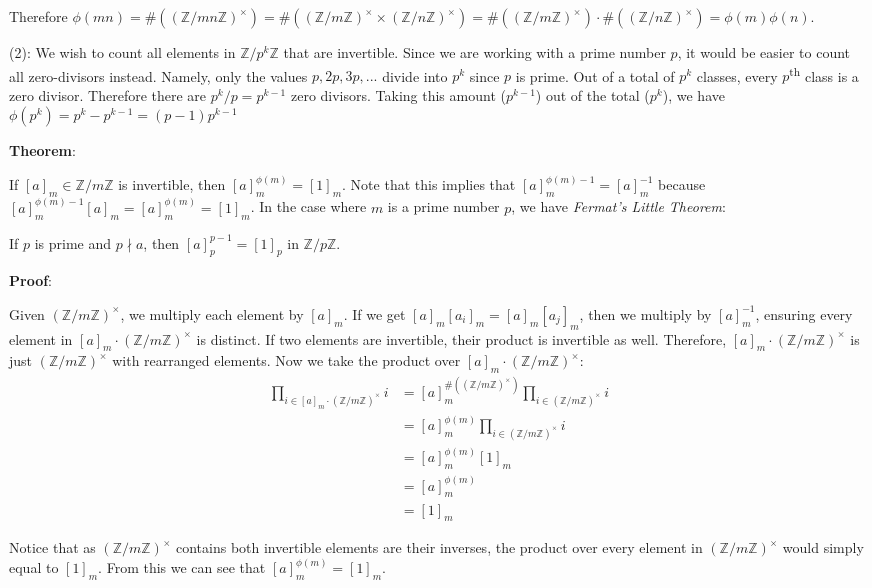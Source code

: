 \documentclass{article}
\begin{document}
\begin{multicols*}{2}
Therefore $\phi(mn) = \#((\mathbb{Z}/mn\mathbb{Z})^\times) = \#((\mathbb{Z}/m\mathbb{Z})^\times \times (\mathbb{Z}/n\mathbb{Z})^\times) = \#((\mathbb{Z}/m\mathbb{Z})^\times) \cdot \#((\mathbb{Z}/n\mathbb{Z})^\times) = \phi(m)\phi(n)$.

(2): We wish to count all elements in $\mathbb{Z}/p^k\mathbb{Z}$ that are invertible. Since we are working with a prime number $p$, it would be easier to count all zero-divisors instead. Namely, only the values $p,2p,3p,...$ divide into $p^k$ since $p$ is prime. Out of a total of $p^k$ classes, every $p$\textsuperscript{th} class is a zero divisor. Therefore there are $p^{k}/p = p^{k-1}$ zero divisors. Taking this amount ($p^{k-1}$) out of the total ($p^k$), we have $\phi(p^k) = p^k - p^{k-1} = (p-1)p^{k-1}$

\textbf{Theorem}:

If $[a]_m \in \mathbb{Z}/m\mathbb{Z}$ is invertible, then $[a]_m^{\phi(m)} = [1]_m$. Note that this implies that $[a]_m^{\phi(m)-1} = [a]_m^{-1}$ because $[a]_m^{\phi(m)-1} [a]_m = [a]_m^{\phi(m)} = [1]_m$. In the case where $m$ is a prime number $p$, we have \textit{Fermat's Little Theorem}:

If $p$ is prime and $p \nmid a$, then $[a]_p^{p-1} = [1]_p$ in $\mathbb{Z}/p\mathbb{Z}$.

\textbf{Proof}:


Given $(\mathbb{Z}/m\mathbb{Z})^\times$, we multiply each element by $[a]_m$. If we get $[a]_m[a_i]_m = [a]_m[a_j]_m$, then we multiply by $[a]_m^{-1}$, ensuring every element in $[a]_m \cdot(\mathbb{Z}/m\mathbb{Z})^\times$ is distinct. If two elements are invertible, their product is invertible as well. Therefore, $[a]_m \cdot(\mathbb{Z}/m\mathbb{Z})^\times$ is just $(\mathbb{Z}/m\mathbb{Z})^\times$ with rearranged elements. Now we take the product over $[a]_m \cdot(\mathbb{Z}/m\mathbb{Z})^\times$:\[\begin{aligned}
\prod_{i \in [a]_m \cdot(\mathbb{Z}/m\mathbb{Z})^\times} i &= [a]_m ^{\#((\mathbb{Z}/m\mathbb{Z})^\times)} \prod_{i \in (\mathbb{Z}/m\mathbb{Z})^\times} i \\
&= [a]_m ^{\phi(m)} \prod_{i \in (\mathbb{Z}/m\mathbb{Z})^\times} i\\
&= [a]_m ^{\phi(m)} [1]_m \\
&= [a]_m ^{\phi(m)} \\
&= [1]_m
\end{aligned}\]

Notice that as $(\mathbb{Z}/m\mathbb{Z})^\times$ contains both invertible elements are their inverses, the product over every element in $(\mathbb{Z}/m\mathbb{Z})^\times$ would simply equal to $[1]_m$. From this we can see that $[a]_m ^{\phi(m)} = [1]_m$.


\end{multicols*}
\end{document}
